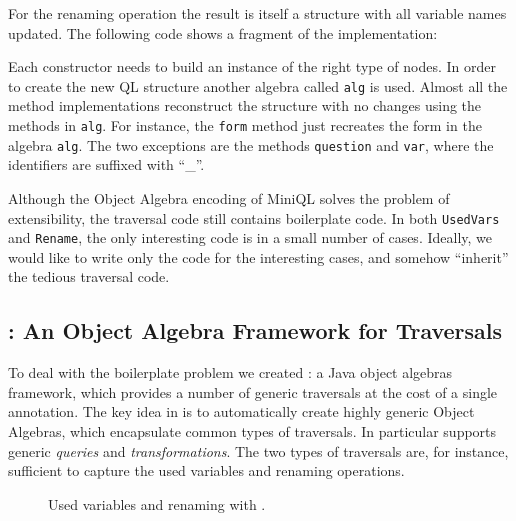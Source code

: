 For the renaming operation the result is itself a structure
with all variable names updated. The following code shows a fragment of the
implementation:


Each
constructor needs to build an instance of the right type of nodes.
In order to create the new
QL structure another algebra called \lstinline{alg} is used.
Almost all the method implementations reconstruct the structure with
no changes using the methods in \lstinline{alg}. For instance, the \lstinline{form} method just recreates the form in the algebra \lstinline{alg}.  The two exceptions are the
methods \lstinline{question} and \lstinline{var}, where the identifiers are suffixed with ``\_''.

Although the Object Algebra encoding of MiniQL solves the problem of extensibility, the traversal code still contains boilerplate code.
In both \lstinline{UsedVars} and \lstinline{Rename}, the only interesting code
is in a small number of cases.  Ideally, we would like to write only
the code for the interesting cases, and somehow ``inherit'' the
tedious traversal code.

\subsection{\Name: An Object Algebra Framework for Traversals}

To deal with the boilerplate problem we created \Name: a Java object
algebras framework, which provides a number of generic traversals at
the cost of a single annotation. The key idea in \name is to
automatically create highly generic Object Algebras, which encapsulate
common types of traversals. In particular \name supports generic
\emph{queries} and \emph{transformations}. The two types of
traversals are, for instance,  sufficient to capture the used variables and
renaming operations.

\begin{figure}[t]
\nocaptionrule
\vspace{-.1in}
\caption{Used variables and renaming with \Name.}
\label{ql_with_oaframework}
\end{figure}

